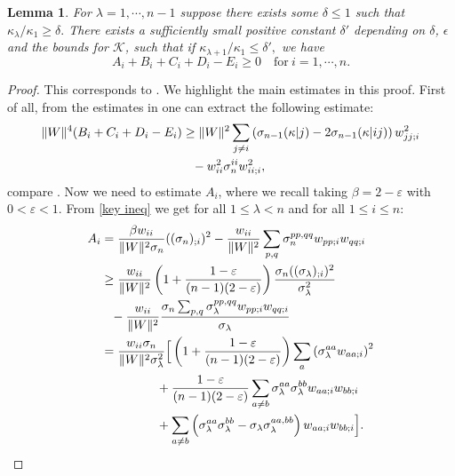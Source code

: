 \documentclass{amsart}
\newtheorem{lemma}[theorem]{Lemma}
\theoremstyle{definition}
\theoremstyle{remark}
\numberwithin{equation}{section}
\begin{document}
\begin{lemma}\label{app3}
For $\lambda=1,\cdots,n-1$ suppose there exists some $\delta\leq 1$ such that $\kappa_{\lambda}/\kappa_1\geq \delta.$ There exists a sufficiently small positive constant $\delta'$ depending on $\delta$, $\epsilon$ and the bounds for $\mathcal{K}$, such that if $\kappa_{\lambda+1}/\kappa_1\leq \delta',$ we have
\[A_i+B_i+C_i+D_i-E_i\geq 0\quad \text{for}~i=1,\cdots,n.\]
\end{lemma}
\begin{proof}
This corresponds to \cite[Lemma~4.3]{Guan}. We highlight the main estimates in this proof. First of all, from the estimates in \cite[Lemma~4.2]{Guan} one can extract the following estimate:
\begin{align}\begin{split}\label{app3-1}
\|W\|^4(B_i+C_i+D_i-E_i)&\geq \|W\|^2\sum_{j\neq i} \left(\sigma_{n-1}(\kappa|j)-2\sigma_{n-1}(\kappa|ij)\right)w_{jj;i}^2\\
				&\hphantom{=}-w_{ii}^2\sigma_{n}^{ii}w_{ii;i}^2,
\end{split}\end{align}
compare \cite[Equ.~(4.16), (4.17)]{Guan}.
Now we need to estimate $A_i$, where we recall taking $\beta=2-\varepsilon$ with $0<\varepsilon<1$. From \eqref{key ineq} we get for all $1\leq \lambda<n$ and for all $1\leq i\leq n\colon$
\begin{align}\begin{split}\label{}
A_i&=\frac{\beta w_{ii}}{\|W\|^2\sigma_n}((\sigma_n)_{;i})^2-\frac{w_{ii}}{\|W\|^2}\sum_{p,q}\sigma_n^{pp,qq}w_{pp;i}w_{qq;i}\\
		&\geq \frac{w_{ii}}{\|W\|^2}\left(1+\frac{1-\varepsilon}{(n-1)(2-\varepsilon)}\right)\frac{\sigma_n((\sigma_{\lambda})_{;i})^2}{\sigma_{\lambda}^2}\\
					&\hphantom{=}-\frac{w_{ii}}{\|W\|^2}\frac{\sigma_n\sum_{p,q}\sigma_{\lambda}^{pp,qq}w_{pp;i}w_{qq;i}}{\sigma_{\lambda}}\\
                    &=\frac{w_{ii}\sigma_n}{\|W\|^2\sigma_{\lambda}^2}\Big[\left(1+\frac{1-\varepsilon}{(n-1)(2-\varepsilon)}\right)\sum_{a}\left(\sigma_{\lambda}^{aa}w_{aa;i}\right)^2\\
                    	&\hphantom{\frac{w_{ii}\sigma_n}{\|W\|^2\sigma_{\lambda}^2}\Big(}+\frac{1-\varepsilon}{(n-1)(2-\varepsilon)}\sum_{a\neq b}\sigma_\lambda^{aa}\sigma_{\lambda}^{bb}w_{aa;i}w_{bb;i}\\
                        &\hphantom{\frac{w_{ii}\sigma_n}{\|W\|^2\sigma_{\lambda}^2}\Big(}+\sum_{a\neq b}\left(\sigma_{\lambda}^{aa}\sigma_{\lambda}^{bb}-\sigma_{\lambda}\sigma_{\lambda}^{aa,bb}\right)w_{aa;i}w_{bb;i}\Big].
\end{split}\end{align}


\end{proof}
\end{document}
